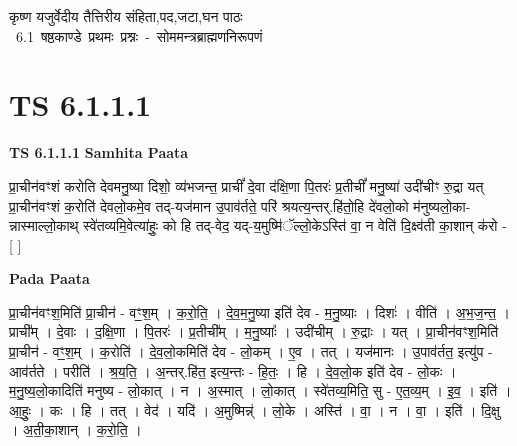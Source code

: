 \documentclass[17pt]{extarticle}
\begin{document}
\begin{titlepage}
    \begin{center}
 
\begin{sanskrit}
    { \Large
    कृष्ण यजुर्वेदीय तैत्तिरीय संहिता,पद,जटा,घन पाठः 
    }
    \\
    \vspace{2.5cm}
    \mbox{ \Large
    6.1      षष्ठकाण्डे प्रथमः प्रश्नः - सोममन्त्रब्राह्मणनिरूपणं   }
\end{sanskrit}
\end{center}

\end{titlepage}
\tableofcontents
{}
\pagebreak


\section{ TS 6.1.1.1 }

\textbf{TS 6.1.1.1 } \newline
\textbf{Samhita Paata} \newline

प्रा॒चीन॑वꣳशं करोति देवमनु॒ष्या दिशो॒ व्य॑भजन्त॒ प्राचीं᳚ दे॒वा द॑क्षि॒णा पि॒तरः॑ प्र॒तीचीं᳚ मनु॒ष्या॑ उदी॑चीꣳ रु॒द्रा यत् प्रा॒चीन॑वꣳशं क॒रोति॑ देवलो॒कमे॒व तद्-यज॑मान उ॒पाव॑र्तते॒ परि॑ श्रयत्य॒न्तर्.हि॑तो॒हि दे॑वलो॒को म॑नुष्यलो॒का-न्नास्माल्लो॒काथ् स्वे॑तव्यमि॒वेत्या॑हुः॒ को हि तद्-वेद॒ यद्-य॒मुष्मि॑ॅल्लो॒केऽस्ति॑ वा॒ न वेति॑ दि॒क्ष्व॑ती का॒शान् क॑रो - [  ] \newline

\textbf{Pada Paata} \newline

प्रा॒चीन॑वꣳश॒मिति॑ प्रा॒चीन॑ - वꣳ॒॒श॒म् । क॒रो॒ति॒ । दे॒व॒म॒नु॒ष्या इति॑ देव - म॒नु॒ष्याः । दिशः॑ । वीति॑ । अ॒भ॒ज॒न्त॒ । प्राची᳚म् । दे॒वाः । द॒क्षि॒णा । पि॒तरः॑ । प्र॒तीची᳚म् । म॒नु॒ष्याः᳚ । उदी॑चीम् । रु॒द्राः । यत् । प्रा॒चीन॑वꣳश॒मिति॑ प्रा॒चीन॑ - वꣳ॒॒श॒म् । क॒रोति॑ । दे॒व॒लो॒कमिति॑ देव - लो॒कम् । ए॒व । तत् । यज॑मानः । उ॒पाव॑र्तत॒ इत्यु॑प - आव॑र्तते । परीति॑ । श्र॒य॒ति॒ । अ॒न्तर्.हि॑त॒ इत्य॒न्तः - हि॒तः॒ । हि । दे॒व॒लो॒क इति॑ देव - लो॒कः । म॒नु॒ष्य॒लो॒कादिति॑ मनुष्य - लो॒कात् । न । अ॒स्मात् । लो॒कात् । स्वे॑तव्य॒मिति॒ सु - ए॒त॒व्य॒म् । इ॒व॒ । इति॑ । आ॒हुः॒ । कः । हि । तत् । वेद॑ । यदि॑ । अ॒मुष्मिन्न्॑ । लो॒के । अस्ति॑ । वा॒ । न । वा॒ । इति॑ । दि॒क्षु । अ॒ती॒का॒शान् । क॒रो॒ति॒ ।  \newline
\end{document}
